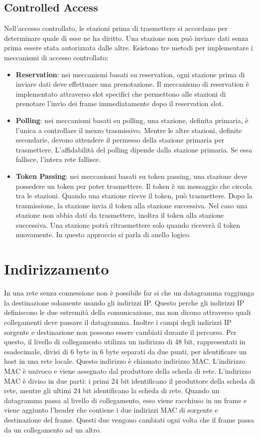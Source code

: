 \documentclass[12pt]{report}
\begin{document}
\subsection{Controlled Access}
Nell'accesso controllato, le stazioni prima di trasmettere si accordano per determinare quale di esse ne ha diritto. Una stazione non può inviare dati senza prima essere stata autorizzata dalle altre. Esistono tre metodi per implementare i meccanismi di accesso controllato:
\begin{itemize}
	\item \textbf{Reservation}: nei meccanismi basati su reservation, ogni stazione prima di inviare dati deve effettuare una prenotazione. Il meccanismo di reservation è implementato attraverso slot specifici che permettono alle stazioni di prenotare l'invio dei frame immediatamente dopo il reservation slot.
	\item \textbf{Polling}: nei meccanismi basati su polling, una stazione, definita primaria, è l'unica a controllare il mezzo trasmissivo. Mentre le altre stazioni, definite secondarie, devono attendere il permesso della stazione primaria per trasmettere. L'affidabilità del polling dipende dalla stazione primaria. Se essa fallisce, l'intera rete fallisce.
	\item \textbf{Token Passing}: nei meccanismi basati su token passing, una stazione deve possedere un token per poter trasmettere. Il token è un messaggio che circola tra le stazioni. Quando una stazione riceve il token, può trasmettere. Dopo la trasmissione, la stazione invia il token alla stazione successiva. Nel caso una stazione non abbia dati da trasmettere, inoltra il token alla stazione successiva. Una stazione potrà ritrasmettere solo quando riceverà il token nuovamente. In questo approccio si parla di anello logico.
\end{itemize}

\section{Indirizzamento}
In una rete senza connessione non è possibile far si che un datagramma raggiunga la destinazione solamente usando gli indirizzi IP. Questo perche gli indirizzi IP definiscono le due estremità della comunicazione, ma non dicono attraverso quali collegamenti deve passare il datagramma. Inoltre i campi degli indirizzi IP sorgente e destinazione non possono essere cambiati durante il percorso. Per questo, il livello di collegamento utilizza un indirizzo di 48 bit, rappresentati in esadecimale, divisi di 6 byte in 6 byte separati da due punti, per identificare un host in una rete locale. Questo indirizzo è chiamato indirizzo MAC. L'indirizzo MAC è univoco e viene assegnato dal produttore della scheda di rete. L'indirizzo MAC è diviso in due parti: i primi 24 bit identificano il produttore della scheda di rete, mentre gli ultimi 24 bit identificano la scheda di rete. Quando un datagramma passa al livello di collegamento, esso viene racchiuso in un frame e viene aggiunto l'header che contiene i due indirizzi MAC di sorgente e destinazione del frame. Questi due vengono cambiati ogni volta che il frame passa da un collegamento ad un altro.
\end{document}
